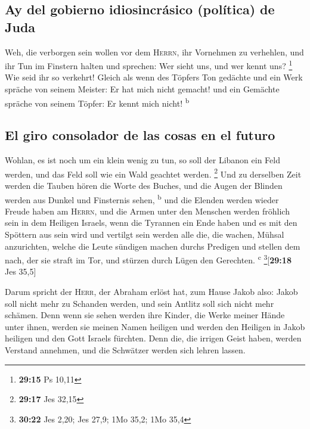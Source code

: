 \hypertarget{ay-del-gobierno-idiosincruxe1sico-poluxedtica-de-juda}{%
\subsection{Ay del gobierno idiosincrásico (política) de
Juda}\label{ay-del-gobierno-idiosincruxe1sico-poluxedtica-de-juda}}

 Weh, die verborgen sein wollen vor dem \textsc{Herrn},
ihr Vornehmen zu verhehlen, und ihr Tun im Finstern halten und sprechen:
Wer sieht uns, und wer kennt uns? \footnote{\textbf{29:15} Ps 10,11}
 Wie seid ihr so verkehrt! Gleich als wenn des Töpfers
Ton gedächte und ein Werk spräche von seinem Meister: Er hat mich nicht
gemacht! und ein Gemächte spräche von seinem Töpfer: Er kennt mich
nicht! \textsuperscript{b}

\hypertarget{el-giro-consolador-de-las-cosas-en-el-futuro}{%
\subsection{El giro consolador de las cosas en el
futuro}\label{el-giro-consolador-de-las-cosas-en-el-futuro}}

 Wohlan, es ist noch um ein klein wenig zu tun, so soll
der Libanon ein Feld werden, und das Feld soll wie ein Wald geachtet
werden. \footnote{\textbf{29:17} Jes 32,15}  Und zu
derselben Zeit werden die Tauben hören die Worte des Buches, und die
Augen der Blinden werden aus Dunkel und Finsternis sehen,
\textsuperscript{b}  und die Elenden werden wieder Freude
haben am \textsc{Herrn}, und die Armen unter den Menschen werden
fröhlich sein in dem Heiligen Israels,  wenn die Tyrannen
ein Ende haben und es mit den Spöttern aus sein wird und vertilgt sein
werden alle die, die wachen, Mühsal anzurichten,  welche
die Leute sündigen machen durchs Predigen und stellen dem nach, der sie
straft im Tor, und stürzen durch Lügen den Gerechten.
\textsuperscript{c} \footnote{\textbf{30:22} Jes 2,20; Jes 27,9; 1Mo
  35,2; 1Mo 35,4}{[}\textbf{29:18} Jes 35,5{]}

 Darum spricht der \textsc{Herr}, der Abraham erlöst hat,
zum Hause Jakob also: Jakob soll nicht mehr zu Schanden werden, und sein
Antlitz soll sich nicht mehr schämen.  Denn wenn sie
sehen werden ihre Kinder, die Werke meiner Hände unter ihnen, werden sie
meinen Namen heiligen und werden den Heiligen in Jakob heiligen und den
Gott Israels fürchten.  Denn die, die irrigen Geist
haben, werden Verstand annehmen, und die Schwätzer werden sich lehren
lassen.

